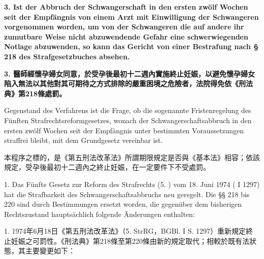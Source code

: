 \documentclass[12pt]{article}
\begin{document}
\syncleft
\begin{sourcepara}
{\bfseries 3. Ist der Abbruch der Schwangerschaft in den ersten zwölf Wochen seit der Empfängnis von einem Arzt mit Einwilligung der Schwangeren vorgenommen worden, um von der Schwangeren die auf andere ihr zumutbare Weise nicht abzuwendende Gefahr eine schwerwiegenden Notlage abzuwenden, so kann das Gericht von einer Bestrafung nach § 218 des Strafgesetzbuches absehen.}
\end{sourcepara}
\begin{transpara}
{\bfseries 3. 醫師經懷孕婦女同意，於受孕後最初十二週內實施終止妊娠，以避免懷孕婦女陷入無法以其他對其可期待之方式排除的嚴重困境之危險者，法院得免依《刑法典》第218條處罰。}
\end{transpara}

\startrandnumbers
{}
\syncleft
\begin{sourcepara}
Gegenstand des Verfahrens ist die Frage, ob die sogenannte Fristenregelung des Fünften Strafrechtsreformgesetzes, wonach der Schwangerschaftsabbruch in den ersten zwölf Wochen seit der Empfängnis unter bestimmten Voraussetzungen straffrei bleibt, mit dem Grundgesetz vereinbar ist.
\end{sourcepara}
\begin{transpara}
本程序之標的，是《第五刑法改革法》所謂期限規定是否與《基本法》相容；依該規定，受孕後最初十二週內之終止妊娠，在一定要件下不受處罰。
\end{transpara}

\syncleft
\begin{sourcepara}
1. Das Fünfte Gesetz zur Reform des Strafrechts (5. \abbrStrRG{}) vom 18. Juni 1974 (\abbrBGBl{} I \abbrS{} 1297) hat die Strafbarkeit des Schwangerschaftsabbruchs neu geregelt. Die §§ 218 bis 220 \abbrStGB{} sind durch Bestimmungen ersetzt worden, die gegenüber dem bisherigen Rechtszustand hauptsächlich folgende Änderungen enthalten:
\end{sourcepara}
\begin{transpara}
1. 1974年6月18日《第五刑法改革法》（5. StrRG，BGBl. I S. 1297）重新規定終止妊娠之可罰性。《刑法典》第218條至第220條由新的規定取代；相較於既有法狀態，其主要變更如下：
\end{transpara}
\end{document}
